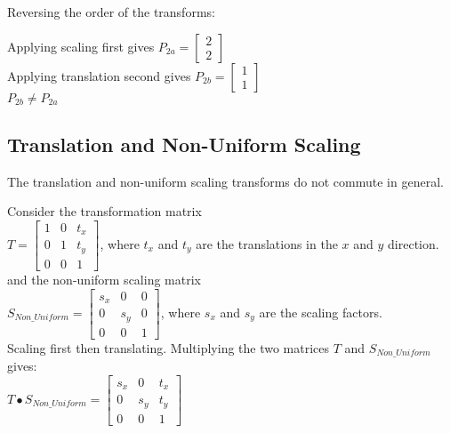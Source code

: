 \documentclass[a4paper,10pt]{scrartcl}
\begin{document}
Reversing the order of the transforms:

Applying scaling first gives $P_{2a} = \begin{bmatrix} 2 \\ 2 \end{bmatrix}$ \\
Applying translation second gives  $P_{2b} = \begin{bmatrix} 1 \\ 1 \end{bmatrix}$ \\

$P_{2b} \neq P_{2a}$

\subsection{Translation and Non-Uniform Scaling}


The translation and non-uniform scaling transforms do not commute in general.

Consider the transformation matrix \\

$T = 
\begin{bmatrix}
    1       & 0 & t_x \\
    0       & 1 & t_y \\
    0       & 0 & 1 
\end{bmatrix}
$, where $t_x $ and $t_y$ are the translations in the $x$ and $y$ direction. \\

and the non-uniform scaling matrix \\

$S_{Non\_Uniform} = \begin{bmatrix}
    s_x       & 0 & 0 \\
    0       & s_y & 0 \\
    0       & 0 & 1     
 \end{bmatrix}
$, where $s_x$ and $s_y$ are the scaling factors. \\

Scaling first then translating. Multiplying the two matrices $T$ and $S_{Non\_Uniform}$ gives: \\

$T \bullet S_{Non\_Uniform} = \begin{bmatrix}
		  s_x & 0 & t_x \\
		  0 & s_y & t_y \\
		  0 & 0 & 1
               \end{bmatrix}
$ \\
\end{document}
